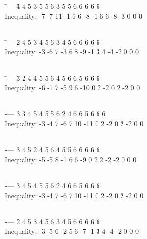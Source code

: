 \documentclass[10pt,journal]{IEEEtran}
\begin{document}
\begin{tabbing}
 \quad \=---- \=4 4 5 3 5 5 6 3 5 5 6 6 6 6 6\\
 \> \>Inequality: -7 -7 11 -1 6 6 -8 -1 6 6 -8 -3 0 0 0 \\
 \>      \\
\end{tabbing}
\begin{tabbing}
 \quad \=---- \=2 4 5 3 4 5 6 3 4 5 6 6 6 6 6 \\
 \> \>Inequality: -3 -6 7 -3 6 8 -9 -1 3 4 -4 -2 0 0 0 \\
 \>      \\
\end{tabbing}
\begin{tabbing}
 \quad \=---- \=3 2 4 4 5 5 6 4 5 6 6 5 6 6 6 \\
 \> \>Inequality: -6 -1 7 -5 9 6 -10 0 2 -2 0 2 -2 0 0 \\
 \>      \\
\end{tabbing}
\begin{tabbing}
 \quad \=---- \=3 3 4 5 4 5 5 6 2 4 6 6 5 6 6 6 \\
 \> \>Inequality: -3 -4 7 -6 7 10 -11 0 2 -2 0 2 -2 0 0 \\
 \>      \\
\end{tabbing}
\begin{tabbing}
 \quad \=---- \=3 4 5 2 4 5 6 4 5 5 6 6 6 6 6 \\
 \> \>Inequality: -5 -5 8 -1 6 6 -9 0 2 2 -2 -2 0 0 0\\
 \>      \\
\end{tabbing}
\begin{tabbing}
 \quad \=---- \= 3 4 5 4 5 5 6 2 4 6 6 5 6 6 6\\
 \> \>Inequality: -3 -4 7 -6 7 10 -11 0 2 -2 0 2 -2 0 0 \\
 \>      \\
\end{tabbing}
\begin{tabbing}
 \quad \=---- \= 2 4 5 3 4 5 6 3 4 5 6 6 6 6 6 \\
 \> \>Inequality: -3 -5 6 -2 5 6 -7 -1 3 4 -4 -2 0 0 0 \\
 \>      \\
\end{tabbing}
\end{document}
